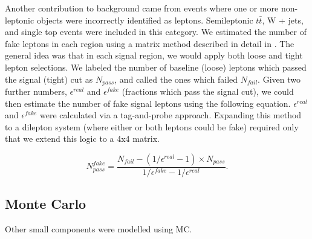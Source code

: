 Another contribution to background came from events where one or more non-leptonic objects were incorrectly identified as leptons. Semileptonic $t\bar{t}$, W + jets, and single top events were included in this category. We estimated the number of fake leptons in each region using a matrix method described in detail in \cite{fake_method}. The general idea was that in each signal region, we would apply both loose and tight lepton selections. We labeled the number of baseline (loose) leptons which passed the signal (tight) cut as $N_{pass}$, and called the ones which failed $N_{fail}$. Given two further numbers, $\epsilon^{real}$ and $\epsilon^{fake}$ (fractions which pass the signal cut), we could then estimate the number of fake signal leptons using the following equation. $\epsilon^{real}$ and $\epsilon^{fake}$ were calculated via a tag-and-probe approach. Expanding this method to a dilepton system (where either or both leptons could be fake) required only that we extend this logic to a 4x4 matrix.

\begin{equation}
N_{pass}^{fake} = \frac{N_{fail}-(1/\epsilon^{real}-1)\times N_{pass}}{1/\epsilon^{fake}-1/\epsilon^{real}}.
\end{equation}

\subsection*{Monte Carlo}

Other small components were modelled using MC.
